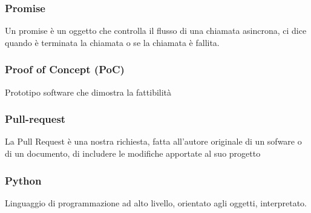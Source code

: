 \subsubsection*{Promise}
Un promise è un oggetto che controlla il flusso di una chiamata asincrona, ci dice quando è terminata la chiamata o se la chiamata è fallita.
\subsubsection*{Proof of Concept (PoC)}
Prototipo software che dimostra la fattibilità 
\subsubsection*{Pull-request}
La Pull Request è una nostra richiesta, fatta all’autore originale di un sofware o di un documento, di includere le modifiche apportate al suo progetto
\subsubsection*{Python}
Linguaggio di programmazione ad alto livello, orientato agli oggetti, interpretato.
